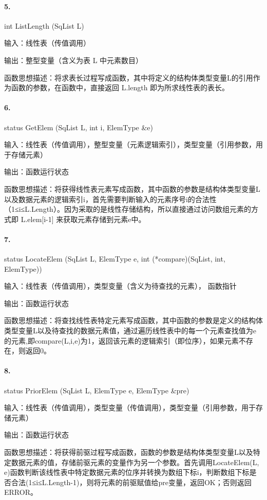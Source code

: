 \documentclass[supercite]{Experimental_Report}
\theoremstyle{definition}
\begin{document}
\paragraph{ 5.}int ListLength (SqList L)

输入：线性表（传值调用）

输出：整型变量（含义为表 L 中元素数目）

函数思想描述：将求表长过程写成函数，其中将定义的结构体类型变量L的引用作为函数的参数，在函数中，直接返回 L.length
即为所求线性表的表长。

\paragraph{ 6.}status GetElem (SqList L, int i, ElemType \&e)

输入：线性表（传值调用），整型变量（元素逻辑索引），类型变量（引用参数，用于存储元素）

输出：函数运行状态

函数思想描述：将获得线性表元素写成函数，其中函数的参数是结构体类型变量L 以及数据元素的逻辑索引i，首先需要判断输入的元素序号i的合法性（1≤i≤L.Length）。因为采取的是线性存储结构，所以直接通过访问数组元素的方式即 L.elem[i-1] 来获取元素存储到元素e中。

\paragraph{ 7.}status LocateElem (SqList L, ElemType e, int (*compare)(SqList, int, ElemType))

输入：线性表（传值调用），类型变量（含义为待查找的元素）， 函数指针

输出：函数运行状态

函数思想描述：将查找线性表特定元素写成函数，其中函数的参数是定义的结构体类型变量L以及待查找的数据元素值，通过遍历线性表中的每一个元素查找值为e的元素,即compare(L,i,e)为1，返回该元素的逻辑索引（即位序），如果元素不存在，则返回0。

\paragraph{ 8.}status PriorElem (SqList L, ElemType e, ElemType \&pre)

输入：线性表（传值调用），类型变量（传值调用），类型变量（引用参数，用于存储元素）

输出：函数运行状态

函数思想描述：将获得前驱过程写成函数，函数的参数是结构体类型变量L以及特定数据元素的值，存储前驱元素的变量作为另一个参数。首先调用LocateElem(L, e)函数判断该线性表中特定数据元素的位序并转换为数组下标i，判断数组下标是否合法(1≤i≤L.Length-1)，则将元素的前驱赋值给pre变量，返回OK；否则返回ERROR。
\end{document}
